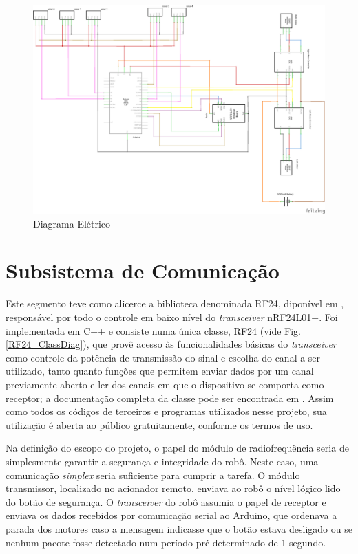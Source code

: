   \begin{figure}[H]
    \centering
    \includegraphics[width= 0.85 \linewidth]{../../Imagens/robot_schem.png}
    \caption{Diagrama Elétrico} %
    \label{fritzing}
  \end{figure}

\section{Subsistema de Comunicação}
Este segmento teve como alicerce a biblioteca denominada RF24, diponível em \cite{nrf_lib}, responsável por todo o controle em baixo nível do 
\textit{transceiver} nRF24L01+.
Foi implementada em C++ e consiste numa única classe, RF24 (vide Fig.\ref{RF24_ClassDiag}), que provê acesso às funcionalidades básicas do 
\textit{transceiver} como controle da potência de transmissão do sinal e escolha do canal a ser utilizado, tanto quanto funções que permitem enviar 
dados por um canal previamente aberto e ler dos canais em que o dispositivo se comporta como receptor; a documentação completa da classe pode ser 
encontrada em .
Assim como todos os códigos de terceiros e programas utilizados nesse projeto, sua utilização é aberta ao público gratuitamente, conforme os termos 
de uso.

Na definição do escopo do projeto, o papel do módulo de radiofrequência seria de simplesmente garantir a segurança e integridade do robô.
Neste caso, uma comunicação \textit{simplex} seria suficiente para cumprir a tarefa.
O módulo transmissor, localizado no acionador remoto, enviava ao robô o nível lógico lido do botão de segurança.
O \textit{transceiver} do robô assumia o papel de receptor e enviava os dados recebidos por comunicação serial ao Arduino, que ordenava a parada dos 
motores caso a mensagem indicasse que o botão estava desligado ou se nenhum pacote fosse detectado num período pré-determinado de 1 segundo.

